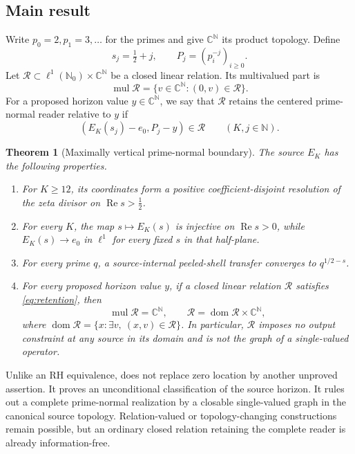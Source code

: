 \documentclass[11pt]{article}
\newtheorem{theorem}{Theorem}[section]
\theoremstyle{definition}
\theoremstyle{remark}
\newcommand{\C}{\mathbb C}
\newcommand{\N}{\mathbb N}
\newcommand{\cR}{\mathcal R}
\newcommand{\Rea}{\operatorname{Re}}
\newcommand{\mul}{\operatorname{mul}}
\begin{document}
\subsection*{Main result}

Write \(p_0=2,p_1=3,\ldots\) for the primes and give \(\C^\N\) its product
topology.  Define
\[
  s_j=\tfrac12+j,\qquad
  P_j=(p_i^{-j})_{i\geq0}.
\tag{1.4}\label{eq:sample-packets}
\]
Let \(\cR\subset \ell^1(\N_0)\times\C^\N\) be a closed linear relation.
Its multivalued part is
\[
                 \mul\cR=\{v\in\C^\N:(0,v)\in\cR\}.
\tag{1.5}\label{eq:mul}
\]
For a proposed horizon value \(y\in\C^\N\), we say that \(\cR\) retains the
centered prime-normal reader relative to \(y\) if
\[
                 (E_K(s_j)-e_0,P_j-y)\in\cR
                 \qquad(K,j\in\N).
\tag{1.6}\label{eq:retention}
\]

\begin{theorem}[Maximally vertical prime-normal boundary]\label{thm:main}
The source \(E_K\) has the following properties.
\begin{enumerate}[label=\textup{(\roman*)},leftmargin=2.2em]
\item For \(K\geq12\), its coordinates form a positive
      coefficient-disjoint resolution of the zeta divisor on
      \(\Rea s>\tfrac12\).
\item For every \(K\), the map \(s\mapsto E_K(s)\) is injective on
      \(\Rea s>0\), while \(E_K(s)\to e_0\) in \(\ell^1\) for every fixed
      \(s\) in that half-plane.
\item For every prime \(q\), a source-internal peeled-shell transfer converges
      to \(q^{1/2-s}\).
\item For every proposed horizon value \(y\), if a closed linear relation
      \(\cR\) satisfies \eqref{eq:retention}, then
      \[
          \mul\cR=\C^\N,\qquad
          \cR=\operatorname{dom}\cR\times\C^\N,
      \tag{1.7}\label{eq:projectively-full}
      \]
      where
      \(\operatorname{dom}\cR=\{x:\exists v,\ (x,v)\in\cR\}\).
      In particular, \(\cR\) imposes no output constraint at any source in
      its domain and is not the graph of a single-valued operator.
\end{enumerate}
\end{theorem}

Unlike an RH equivalence,  does not replace zero location by
another unproved assertion.  It proves an unconditional classification of the
source horizon.  It rules out a complete prime-normal realization by a
closable single-valued graph in the canonical source topology.  Relation-valued
or topology-changing constructions remain possible, but an ordinary closed
relation retaining the complete reader is already information-free.
\end{document}
